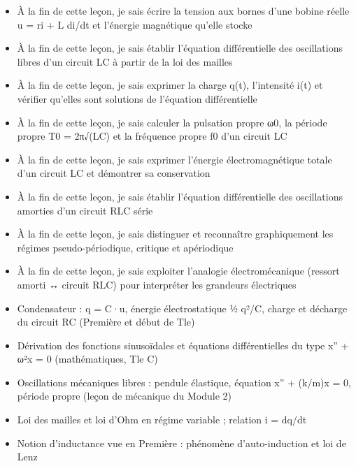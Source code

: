 \documentclass[11pt]{article}
\begin{document}
\begin{objectifs}
\begin{itemize}
\item À la fin de cette leçon, je sais écrire la tension aux bornes d'une bobine réelle u = ri + L di/dt et l'énergie magnétique qu'elle stocke
\item À la fin de cette leçon, je sais établir l'équation différentielle des oscillations libres d'un circuit LC à partir de la loi des mailles
\item À la fin de cette leçon, je sais exprimer la charge q(t), l'intensité i(t) et vérifier qu'elles sont solutions de l'équation différentielle
\item À la fin de cette leçon, je sais calculer la pulsation propre ω0, la période propre T0 = 2π√(LC) et la fréquence propre f0 d'un circuit LC
\item À la fin de cette leçon, je sais exprimer l'énergie électromagnétique totale d'un circuit LC et démontrer sa conservation
\item À la fin de cette leçon, je sais établir l'équation différentielle des oscillations amorties d'un circuit RLC série
\item À la fin de cette leçon, je sais distinguer et reconnaître graphiquement les régimes pseudo-périodique, critique et apériodique
\item À la fin de cette leçon, je sais exploiter l'analogie électromécanique (ressort amorti ↔ circuit RLC) pour interpréter les grandeurs électriques
\end{itemize}
\end{objectifs}

\begin{prerequis}
\begin{itemize}
\item Condensateur : q = C·u, énergie électrostatique ½ q²/C, charge et décharge du circuit RC (Première et début de Tle)
\item Dérivation des fonctions sinusoïdales et équations différentielles du type x'' + ω²x = 0 (mathématiques, Tle C)
\item Oscillations mécaniques libres : pendule élastique, équation x'' + (k/m)x = 0, période propre (leçon de mécanique du Module 2)
\item Loi des mailles et loi d'Ohm en régime variable ; relation i = dq/dt
\item Notion d'inductance vue en Première : phénomène d'auto-induction et loi de Lenz
\end{itemize}
\end{prerequis}
\end{document}
